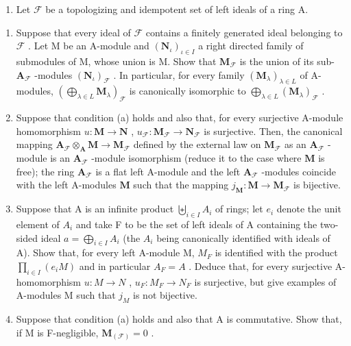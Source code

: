 \begin{enumerate}
\def\labelenumi{\arabic{enumi}.}
\setcounter{enumi}{19}
\tightlist
\item
  Let \(\mathcal{F}\) be a topologizing and idempotent set of left ideals of a ring A.
\end{enumerate}

\begin{enumerate}
\def\labelenumi{(\alph{enumi})}
\item
  Suppose that every ideal of \(\mathcal{F}\) contains a finitely generated ideal belonging to \(\mathcal{F}\) . Let M be an A-module and \((\mathbf{N}_{\iota})_{\iota \in I}\) a right directed family of submodules of M, whose union is M. Show that \(\mathbf{M}_{\mathcal{F}}\) is the union of its sub- \(\mathbf{A}_{\mathcal{F}}\) -modules \((\mathbf{N}_{\iota})_{\mathcal{F}}\) . In particular, for every family \((\mathbf{M}_{\lambda})_{\lambda \in L}\) of A-modules, \(\left( \bigoplus_{\lambda \in L} \mathbf{M}_{\lambda} \right)_{\mathcal{F}}\) is canonically isomorphic to \(\bigoplus_{\lambda \in L} (\mathbf{M}_{\lambda})_{\mathcal{F}}\) .
\item
  Suppose that condition (a) holds and also that, for every surjective A-module homomorphism \(u \colon \mathbf{M} \to \mathbf{N}\) , \(u_{\mathcal{F}} \colon \mathbf{M}_{\mathcal{F}} \to \mathbf{N}_{\mathcal{F}}\) is surjective. Then, the canonical mapping \(\mathbf{A}_{\mathcal{F}} \otimes_{\mathbf{A}} \mathbf{M} \to \mathbf{M}_{\mathcal{F}}\) defined by the external law on \(\mathbf{M}_{\mathcal{F}}\) as an \(\mathbf{A}_{\mathcal{F}}\) -module is an \(\mathbf{A}_{\mathcal{F}}\) -module isomorphism (reduce it to the case where \(\mathbf{M}\) is free); the ring \(\mathbf{A}_{\mathcal{F}}\) is a flat left A-module and the left \(\mathbf{A}_{\mathcal{F}}\) -modules coincide with the left A-modules \(\mathbf{M}\) such that the mapping \(j_{\mathbf{M}} \colon \mathbf{M} \to \mathbf{M}_{\mathcal{F}}\) is bijective.
\item
  Suppose that A is an infinite product \(\biguplus_{i\in I}A_{i}\) of rings; let \(e_{i}\) denote the unit element of \(A_{i}\) and take F to be the set of left ideals of A containing the two-sided ideal \(a=\bigoplus_{i\in I}A_{i}\) (the \(A_{i}\) being canonically identified with ideals of A). Show that, for every left A-module M, \(M_{F}\) is identified with the product \(\prod_{i\in I}(e_{i}M)\) and in particular \(A_{F}=A\) . Deduce that, for every surjective A-homomorphism \(u: M\to N\) , \(u_{F}: M_{F}\to N_{F}\) is surjective, but give examples of A-modules M such that \(j_{M}\) is not bijective.
\item
  Suppose that condition (a) holds and also that A is commutative. Show that, if M is F-negligible, \(\mathbf{M}_{(\mathcal{F})}=0\) .
\end{enumerate}

